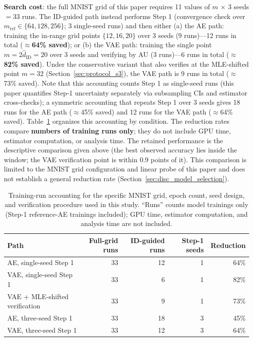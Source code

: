 \documentclass[make,article,submit,pdftex,moreauthors]{Definitions/mdpi}
\newcommand{\hatdID}{\hat{d}_{\mathrm{ID}}}
\begin{document}
\textbf{Search cost}: the full MNIST grid of this paper requires 11 values
of $m$ $\times$ 3 seeds $= 33$ runs.
The ID-guided path instead performs Step 1 (convergence check over
$m_{\mathrm{ref}} \in \{64, 128, 256\}$; 3 single-seed runs) and then either
(a) the AE path: training the in-range grid points $\{12, 16, 20\}$ over 3
seeds (9 runs)---12 runs in total (\textbf{$\approx$64\% saved}); or
(b) the VAE path: training the single point $m = 2\hatdID = 20$ over 3 seeds
and verifying by AU (3 runs)---6 runs in total
(\textbf{$\approx$82\% saved}).
Under the conservative variant that also verifies at the MLE-shifted point
$m = 32$ (Section~\ref{sec:protocol_s3}), the VAE path is 9 runs in total
($\approx$73\% saved).
Note that this accounting counts Step 1 as single-seed runs (this paper
quantifies Step-1 uncertainty separately via subsampling CIs and estimator
cross-checks); a symmetric accounting that repeats Step 1 over 3 seeds
gives 18 runs for the AE path ($\approx$45\% saved) and 12 runs for the VAE
path ($\approx$64\% saved).
Table~\ref{tab:cost} organizes this accounting by condition.
The reduction rates compare \textbf{numbers of training runs only}; they do
not include GPU time, estimator computation, or analysis time.
The retained performance is the descriptive comparison given above (the
best observed accuracy lies inside the window; the VAE verification point
is within $0.9$ points of it).
This comparison is limited to the MNIST grid configuration and linear probe
of this paper and does not establish a general reduction rate
(Section~\ref{sec:disc_model_selection}).

\begin{table}[H]
\caption{Training-run accounting for the specific MNIST grid, epoch count,
seed design, and verification procedure used in this study. ``Runs''
counts model trainings only (Step-1 reference-AE trainings included); GPU
time, estimator computation, and analysis time are not included.}
\label{tab:cost}
\small
\begin{tabular}{lrrrr}
\toprule
\textbf{Path} & \textbf{Full-grid runs} & \textbf{ID-guided runs} & \textbf{Step-1 seeds} & \textbf{Reduction} \\
\midrule
AE, single-seed Step 1 & 33 & 12 & 1 & 64\% \\
VAE, single-seed Step 1 & 33 & 6 & 1 & 82\% \\
VAE + MLE-shifted verification & 33 & 9 & 1 & 73\% \\
AE, three-seed Step 1 & 33 & 18 & 3 & 45\% \\
VAE, three-seed Step 1 & 33 & 12 & 3 & 64\% \\
\bottomrule
\end{tabular}
\end{table}
\end{document}
